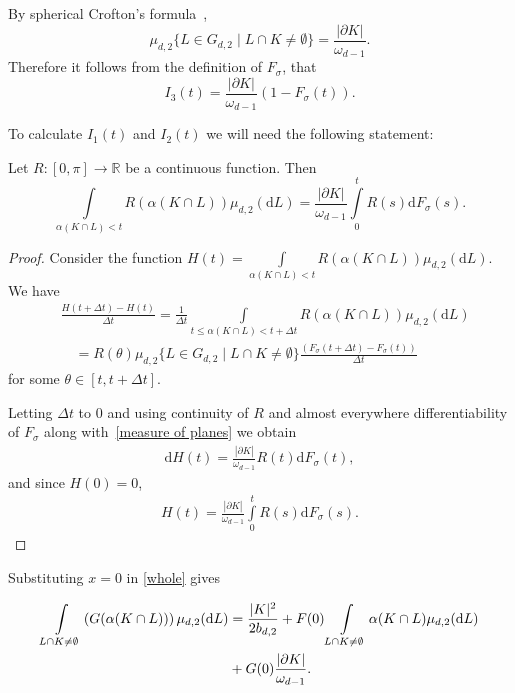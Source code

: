 \documentclass[12pt, reqno]{amsart}
\begin{document}
By spherical Crofton's formula~\cite[Section~6.5]{SW08},
\begin{equation}\label{measure of planes}
    \mu_{d,2}\{L \in G_{d,2} \mid L\cap K  \neq \emptyset\} = \frac{|\partial K|}{\omega_{d-1}}.
\end{equation}
Therefore it follows from the definition of $F_{\sigma}$, that 
\begin{equation}\label{part 3}
    I_3(t) = \frac{|\partial K|}{\omega_{d-1}} \left(1 - F_{\sigma}(t)\right).
\end{equation}


To calculate $I_1(t)$ and $I_2(t)$ we will need the following statement:
\begin{lemma}
Let $R: [0, \pi] \rightarrow \mathbb{R}$ be a continuous function. Then
\begin{equation}\label{lemma 1}
    \int\limits_{\alpha(K \cap L) < t} R(\alpha(K \cap L))\mu_{d,2}(\mathrm{d}L) =\frac{|\partial K|}{\omega_{d-1}}\int\limits_0^t R(s) \mathrm{d}F_{\sigma}(s).
\end{equation}
\end{lemma}
\begin{proof}
Consider the function $H(t) = \int\limits_{\alpha(K \cap L) < t} R(\alpha(K \cap L))\mu_{d,2}(\mathrm{d}L)$. We have
\begin{align*}
    &\frac{H(t + \Delta t) - H(t)}{\Delta t} = \frac{1}{\Delta t}\int\limits_{t \leqslant \alpha(K \cap L) < t + \Delta t}R(\alpha(K \cap L))\mu_{d,2}(\mathrm{d}L) \\
    &\quad= R(\theta)\mu_{d,2}\{L \in G_{d,2} \mid L\cap K  \neq \emptyset\}\frac{(F_{\sigma}(t + \Delta t) - F_{\sigma}(t))}{\Delta t}
\end{align*}
for some $\theta \in [t, t + \Delta t]$.

Letting $\Delta t$ to $0$ and using continuity of $R$ and almost everywhere differentiability of $F_{\sigma}$ along with~\eqref{measure of planes} we obtain
\begin{align*}
    \mathrm{d}H(t) = \frac{|\partial K|}{\omega_{d-1}}R(t)\mathrm{d}F_{\sigma}(t),
\end{align*}
and since $H(0) = 0$,
\begin{align*}
    H(t) = \frac{|\partial K|}{\omega_{d-1}}\int\limits_0^t R(s)
\mathrm{d}F_{\sigma}(s).
\end{align*}
\end{proof}

Substituting $x = 0$ in \eqref{whole} gives

\begin{align}\label{G average}
    \int\limits_{L \cap K \neq \emptyset}\left(G(\alpha(K \cap L)) \right)\mu_{d,2}(\mathrm{d}L) &= \frac{|K|^2}{2b_{d,2}} + F(0)\int\limits_{L \cap K \neq \emptyset}\alpha(K \cap L)\mu_{d,2}(\mathrm{d}L)  \\ \notag
    &+ G(0)\frac{|\partial K|}{\omega_{d-1}}. 
\end{align}
\end{document}
